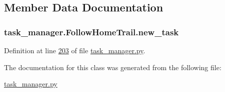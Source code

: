 \subsection{Member Data Documentation}
\hypertarget{classtask__manager_1_1FollowHomeTrail_aae7878e14c1b1aeeac617e2e03074705}{
\subsubsection[{new\+\_\+task}]{\setlength{\rightskip}{0pt plus 5cm}task\+\_\+manager.\+Follow\+Home\+Trail.\+new\+\_\+task}}\label{classtask__manager_1_1FollowHomeTrail_aae7878e14c1b1aeeac617e2e03074705}


Definition at line \hyperlink{task__manager_8py_source_l00203}{203} of file \hyperlink{task__manager_8py_source}{task\+\_\+manager.\+py}.



The documentation for this class was generated from the following file\+:\begin{DoxyCompactItemize}
\item 
\hyperlink{task__manager_8py}{task\+\_\+manager.\+py}\end{DoxyCompactItemize}
